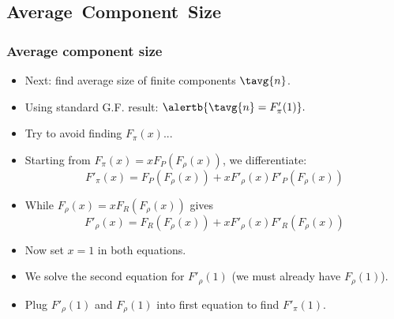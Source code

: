 \subsection{Average\ Component\ Size}

\begin{frame}[label=]
  \frametitle{Average component size}

  \begin{itemize}
  \item<1-> Next: find \alert{average size} of finite components $\tavg{n}$.
  \item<2-> 
    Using standard G.F. result:
    $
    \alertb{\tavg{n} = F'_\pi(1)}.
    $
  \item<3-> 
    Try to avoid finding $F_\pi(x)$...
  \item<4-> 
    Starting from 
    $
    F_{\pi}(x)
    =
    x
    F_{P}
    \left(
      F_{\rho} (x)
    \right)
    $, 
    we differentiate:
    $$
    F'_{\pi}(x)
    =
    F_{P}
    \left(
      F_{\rho} (x)
    \right)
    +    
    x
    F'_{\rho} (x)
    F'_{P}
    \left(
      F_{\rho} (x)
    \right)
    $$
  \item<5-> 
    While
    $
    F_{\rho}(x)
    =
    x
    F_{R}
    \left(
      F_{\rho} (x)
    \right)
    $
    gives
    $$
    F'_{\rho}(x)
    =
    F_{R}
    \left(
      F_{\rho} (x)
    \right)
    +   
    x
    F'_{\rho} (x)
    F'_{R}
    \left(
      F_{\rho} (x)
    \right)
    $$
  \item<6->
    Now set $x=1$ in both equations.
  \item<7->
    We solve the second equation for $F'_\rho(1)$
    (we must already have $F_\rho(1)$).
  \item<8->
    Plug $F'_\rho(1)$ and $F_\rho(1)$ into first equation to find $F'_\pi(1)$.
  \end{itemize}

\end{frame}
  
